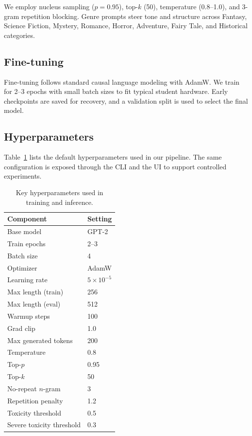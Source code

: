 \documentclass[conference]{IEEEtran}
\begin{document}
We employ nucleus sampling ($p=0.95$), top-$k$ (50), temperature (0.8--1.0), and 3-gram repetition blocking. Genre prompts steer tone and structure across Fantasy, Science Fiction, Mystery, Romance, Horror, Adventure, Fairy Tale, and Historical categories.

\subsection{Fine-tuning}
Fine-tuning follows standard causal language modeling with AdamW. We train for 2--3 epochs with small batch sizes to fit typical student hardware. Early checkpoints are saved for recovery, and a validation split is used to select the final model.

\subsection{Hyperparameters}
Table~\ref{tab:hparams} lists the default hyperparameters used in our pipeline. The same configuration is exposed through the CLI and the UI to support controlled experiments.

\begin{table}[t]
    \centering
    \caption{Key hyperparameters used in training and inference.}
    \label{tab:hparams}
    \begin{tabular}{ll}
        \toprule
        Component & Setting \\
        \midrule
        Base model & GPT-2 \\
        Train epochs & 2--3 \\
        Batch size & 4 \\
        Optimizer & AdamW \\
        Learning rate & \(5\times 10^{-5}\) \\
        Max length (train) & 256 \\
        Max length (eval) & 512 \\
        Warmup steps & 100 \\
        Grad clip & 1.0 \\
        \midrule
        Max generated tokens & 200 \\
        Temperature & 0.8 \\
        Top-\(p\) & 0.95 \\
        Top-\(k\) & 50 \\
        No-repeat \(n\)-gram & 3 \\
        Repetition penalty & 1.2 \\
        \midrule
        Toxicity threshold & 0.5 \\
        Severe toxicity threshold & 0.3 \\
        \bottomrule
    \end{tabular}
\end{table}
\end{document}
